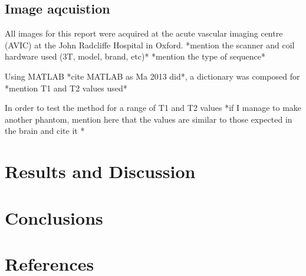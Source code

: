 \documentclass[review]{elsarticle}
\begin{document}
\subsection{Image aqcuistion}
All images for this report were acquired at the acute vascular imaging centre (AVIC) at the John Radcliffe Hospital in Oxford.
*mention the scanner and coil hardware used (3T, model, brand, etc)*
*mention the type of sequence*

Using MATLAB *cite MATLAB as Ma 2013 did*, a dictionary was composed for *mention T1 and T2 values used*

In order to test the method for a range of T1 and T2 values *if I manage to make another phantom, mention here that the values are similar to those expected in the brain and cite it *

\section{Results and Discussion}

\section{Conclusions}

\section*{References}


\end{document}

